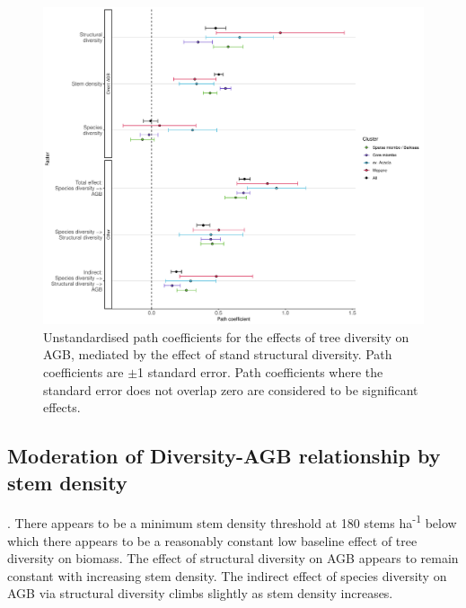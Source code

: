 \documentclass[11pt,a4paper]{article}
\newcommand{\textapprox}{\raisebox{0.5ex}{\texttildelow}}  %
\begin{document}
\begin{figure}[H]
\centering
	\includegraphics[width=\textwidth]{struc_model_slopes_all}
	\caption{Unstandardised path coefficients for the effects of tree diversity on AGB, mediated by the effect of stand structural diversity. Path coefficients are $\pm$1 standard error. Path coefficients where the standard error does not overlap zero are considered to be significant effects.}
	\label{struc_model_slopes_all}
\end{figure}



\subsection*{Moderation of Diversity-AGB relationship by stem density}

. There appears to be a minimum stem density threshold at \textapprox{}180 stems ha\textsuperscript{-1} below which there appears to be a reasonably constant low baseline effect of tree diversity on biomass. The effect of structural diversity on AGB appears to remain constant with increasing stem density. The indirect effect of species diversity on AGB via structural diversity climbs slightly as stem density increases.
\end{document}
